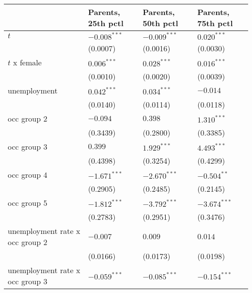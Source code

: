 \begin{tabular}{llll}
\toprule
{} & Parents, 25th pctl & Parents, 50th pctl & Parents, 75th pctl \\
\midrule
$t$                                      &     $-0.008^{***}$ &     $-0.009^{***}$ &      $0.020^{***}$ \\
                                         &           (0.0007) &           (0.0016) &           (0.0030) \\
$t$ x female                             &      $0.006^{***}$ &      $0.028^{***}$ &      $0.016^{***}$ \\
                                         &           (0.0010) &           (0.0020) &           (0.0039) \\
unemployment                             &      $0.042^{***}$ &      $0.034^{***}$ &           $-0.014$ \\
                                         &           (0.0140) &           (0.0114) &           (0.0118) \\
occ group 2                              &           $-0.094$ &            $0.398$ &      $1.310^{***}$ \\
                                         &           (0.3439) &           (0.2800) &           (0.3385) \\
occ group 3                              &            $0.399$ &      $1.929^{***}$ &      $4.493^{***}$ \\
                                         &           (0.4398) &           (0.3254) &           (0.4299) \\
occ group 4                              &     $-1.671^{***}$ &     $-2.670^{***}$ &      $-0.504^{**}$ \\
                                         &           (0.2905) &           (0.2485) &           (0.2145) \\
occ group 5                              &     $-1.812^{***}$ &     $-3.792^{***}$ &     $-3.674^{***}$ \\
                                         &           (0.2783) &           (0.2951) &           (0.3476) \\
unemployment rate x occ group 2          &           $-0.007$ &            $0.009$ &            $0.014$ \\
                                         &           (0.0166) &           (0.0173) &           (0.0198) \\
unemployment rate x occ group 3          &     $-0.059^{***}$ &     $-0.085^{***}$ &     $-0.154^{***}$ \\

\end{tabular}
